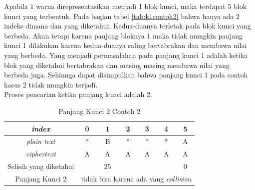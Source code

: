 	Apabila $1$ warna direpresentasikan menjadi 1 blok kunci, maka terdapat 5 blok kunci yang terbentuk. Pada bagian tabel \ref{tab:k1contoh2} bahwa hanya ada 2 indeks dimana \plaintext dan \ciphertext yang diketahui. Kedua-duanya terletak pada blok kunci yang berbeda. Akan tetapi karena panjang bloknya $1$ maka tidak mungkin panjang kunci 1 dilakukan karena kedua-duanya saling bertabrakan dan membawa nilai yang berbeda. Yang menjadi permasalahan pada panjang kunci 1 adalah ketika blok yang diketahui bertabrakan dan masing masing membawa nilai yang berbeda juga. Sehinnga dapat disimpulkan bahwa panjang kunci 1 pada contoh kasus 2 tidak mungkin terjadi.
	\\
	Proses pencarian ketika panjang kunci adalah 2.
	\begin{table}[H]
	 	\centering
	 	\setlength{\arrayrulewidth}{.08em}
	 	\begin{tabular}{|c|c|c|c|c|c|c|}\hline
		\textit{index}&0&1&2&3&4&5\\ \hline
	 	\textit{plain text}&\cellcolor{blue!15}*&\cellcolor{blue!15}B&\cellcolor{green!15}*&\cellcolor{green!15}*&\cellcolor{pink!30}*&\cellcolor{pink!30}A\\ \hline
	 	\textit{ciphertext}&\cellcolor{blue!15}A&\cellcolor{blue!15}A&\cellcolor{green!15}A&\cellcolor{green!15}A&\cellcolor{pink!30}A&\cellcolor{pink!30}A\\ \hline
	 	Selisih yang diketahui& &25& & & &0\\ \hline
	 	Panjang Kunci 2 & \multicolumn{6}{c|}{tidak bisa karena ada yang \textit{collision}}\\ \hline
	 	\end{tabular}
	 	\caption{Panjang Kunci 2 Contoh 2}
	 	\label{tab:k2contoh2}
	\end{table}	
	
